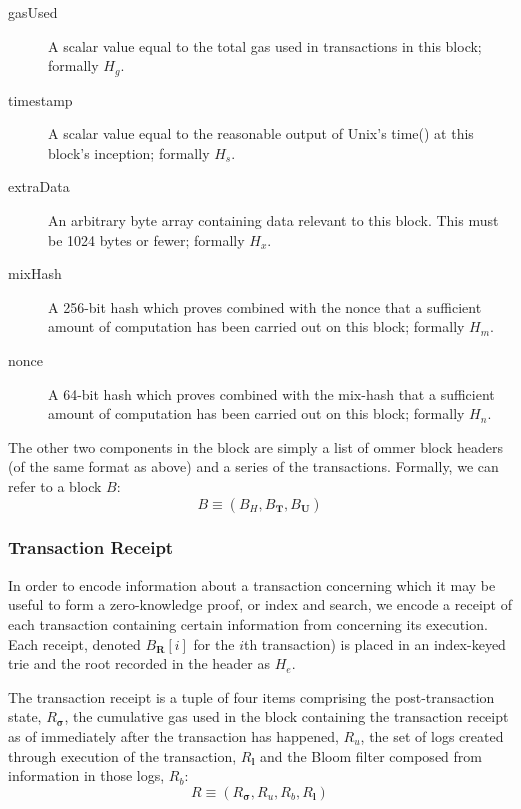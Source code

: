 \documentclass[9pt,oneside]{amsart}
\begin{document}
\begin{multicols}{2}
\begin{description}
\item[gasUsed] A scalar value equal to the total gas used in transactions in this block; formally $H_g$.
\item[timestamp] A scalar value equal to the reasonable output of Unix's time() at this block's inception; formally $H_s$.
\item[extraData] An arbitrary byte array containing data relevant to this block. This must be 1024 bytes or fewer; formally $H_x$.
\item[mixHash] A 256-bit hash which proves combined with the nonce that a sufficient amount of computation has been carried out on this block; formally $H_m$.
\item[nonce] A 64-bit hash which proves combined with the mix-hash that a sufficient amount of computation has been carried out on this block; formally $H_n$.
\end{description}

The other two components in the block are simply a list of ommer block headers (of the same format as above) and a series of the transactions. Formally, we can refer to a block $B$:
\begin{equation}
B \equiv (B_H, B_\mathbf{T}, B_\mathbf{U})
\end{equation}

\subsubsection{Transaction Receipt}

In order to encode information about a transaction concerning which it may be useful to form a zero-knowledge proof, or index and search, we encode a receipt of each transaction containing certain information from concerning its execution. Each receipt, denoted $B_\mathbf{R}[i]$ for the $i$th transaction) is placed in an index-keyed trie and the root recorded in the header as $H_e$.

The transaction receipt is a tuple of four items comprising the post-transaction state, $R_{\boldsymbol{\sigma}}$, the cumulative gas used in the block containing the transaction receipt as of immediately after the transaction has happened, $R_u$, the set of logs created through execution of the transaction, $R_\mathbf{l}$ and the Bloom filter composed from information in those logs, $R_b$:
\begin{equation}
R \equiv (R_{\boldsymbol{\sigma}}, R_u, R_b, R_\mathbf{l})
\end{equation}


\end{multicols}
\end{document}
